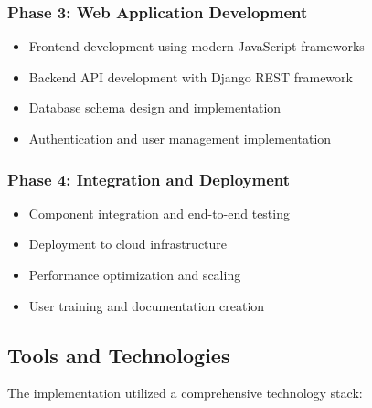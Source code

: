 \documentclass[12pt]{article}
\begin{document}

\subsubsection{Phase 3: Web Application Development}
\begin{itemize}
    \item Frontend development using modern JavaScript frameworks
    \item Backend API development with Django REST framework
    \item Database schema design and implementation
    \item Authentication and user management implementation
\end{itemize}

\subsubsection{Phase 4: Integration and Deployment}
\begin{itemize}
    \item Component integration and end-to-end testing
    \item Deployment to cloud infrastructure
    \item Performance optimization and scaling
    \item User training and documentation creation
\end{itemize}

\subsection{Tools and Technologies}
The implementation utilized a comprehensive technology stack:


\end{document}
\end{itemize}
\end{document}

